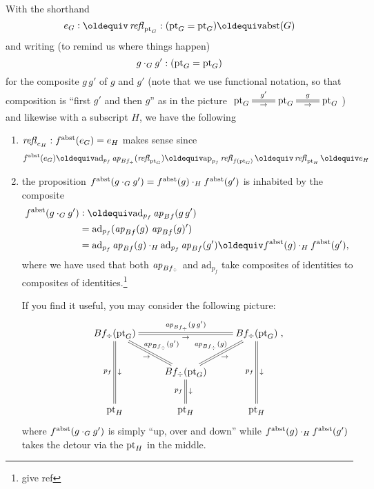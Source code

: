 \begin{definition}
With the shorthand $$e_G\defequi\refl{\pt_G}:(\pt_G=\pt_G)\oldequiv\abstr(G)$$ and writing (to remind us where things happen)
$$g\cdot_Gg':({\mathord{\mathrm{pt}}}_G={\mathord{\mathrm{pt}}}_G)$$
 for the composite $g\,g'$ of $g$ and $g'$ (note that we use functional notation, so that composition is ``first $g'$ and then $g$'' as in the picture 
$\xymatrix{\pt_G\ar@{=}[r]^{g'}_\to&\pt_G\ar@{=}[r]^{g}_\to&\pt_G}$) %
and likewise with a subscript $H$, we have the following
  \begin{enumerate}
  \item $\mathop{{\it refl}_{e_H}}:f^{\mathrm{abst}}(e_G)= e_H$ makes sense since
$$f^\abstr(e_G)\oldequiv\mathrm{ad}_{p_f}\ap{Bf_\div}(\refl{\pt_G})\oldequiv\mathrm{ap}_{p_f}\refl{f(\pt_G)}\oldequiv\refl{\pt_H}\oldequiv e_H
$$
      \item the proposition $f^{\mathrm{abst}}(g\cdot_Gg')=f^{\mathrm{abst}}(g)\cdot_Hf^{\mathrm{abst}}(g')$ is inhabited by the composite
        \begin{align*}
          f^\abstr(g\cdot_Gg')&\defequi %
            \mathrm{ad}_{p_f}\ap{Bf}(g\, g')\\
          &=\mathrm{ad}_{p_f}(\ap{Bf}(g)\,\ap{Bf}(g)')\\
          &=\mathrm{ad}_{p_f}\ap{Bf}(g)\cdot_H\mathrm{ad}_{p_f}\ap{Bf}(g')\oldequiv f^\abstr(g)\cdot_Hf^\abstr(g'),
        \end{align*}
where we have used that both $\mathop{{\it ap}_{Bf_\div}}$ and $\mathrm{ad}_{p_f}$ take composites of identities to composites of identities.\footnote{give ref}

If you find it useful, you may consider the following picture:
$$\xymatrix{
Bf_\div(\pt_G)\ar@{=}[rr]^{\ap{Bf_\div}(g\, g')}_\to\ar@{=}[dr]^{\ap{Bf_\div}(g')}_\to\ar@{=}[dd]_{p_f}^\downarrow
&&Bf_\div(\pt_G)\ar@{=}[dd]_{p_f}^\downarrow\\
&Bf_\div(\pt_G)\ar@{=}[d]_{p_f}^\downarrow
\ar@{=}[ur]^{\ap{Bf_\div}(g)}_\to
&\\
\pt_H&\pt_H&\pt_H},$$
where $f^{\mathrm{abst}}(g\cdot_Gg')$ is simply ``up, over and down'' while $f^{\mathrm{abst}}(g)\cdot_Hf^{\mathrm{abst}}(g')$ takes the detour via the ${\mathord{\mathrm{pt}}}_H$ in the middle.
  \end{enumerate}
\end{definition}
